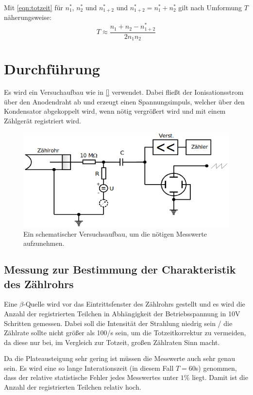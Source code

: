 \documentclass[titlepage = firstcover]{scrartcl}
\begin{document}
          Mit \autoref{eqn:totzeit} für $n^*_1$, $n^*_2$ und $n^*_{1+2}$ und $n^*_{1+2} = n^*_1 + n^*_2$ gilt nach Umformung $T$ näherungsweise:
          \begin{equation}
            T \approx \frac{n_1  + n_2 - n^*_{1+2}}{2 n_1 n_2}
            \label{eqn:zwei_quellen_methode_totzeit}
          \end{equation}
          
    
    \section{Durchführung}
      Es wird ein Versuchaufbau wie in \autoref{} verwendet. Dabei fließt der Ionisationsstrom über den Anodendraht ab und erzeugt einen Spannungsimpuls, welcher über den Kondensator abgekoppelt wird, wenn nötig vergrößert wird und mit einem Zählgerät registriert wird.
      \begin{figure}[h]
        \centering
        \includegraphics[width = 0.7\linewidth]{Versuchsaufbau.png}
        \caption{Ein schematischer Versuchsaufbau, um die nötigen Messwerte aufzunehmen.}
        \label{fig:totzeit_erholungszeit}
      \end{figure}
      \FloatBarrier

        \subsection{Messung zur Bestimmung der Charakteristik des Zählrohrs}
        Eine $\beta$-Quelle wird vor das Eintrittsfenster des Zählrohrs gestellt und es wird die Anzahl der registrierten Teilchen in Abhängigkeit der Betriebsspannung in 10V Schritten gemessen. Dabei soll die Intensität der Strahlung niedrig sein / die Zählrate sollte nicht größer als 100/s sein, um die Totzeitkorrektur zu vermeiden, da diese nur bei, im Vergleich zur Totzeit, großen Zählraten Sinn macht.

        Da die Plateausteigung sehr gering ist müssen die Messwerte auch sehr genau sein. Es wird eine so lange Interationszeit (in diesem Fall $T = 60$s) genommen, dass der relative statistische Fehler jedes Messwertes unter $1 \%$ liegt. Damit ist die Anzahl der registrierten Teilchen relativ hoch.
\end{document}
